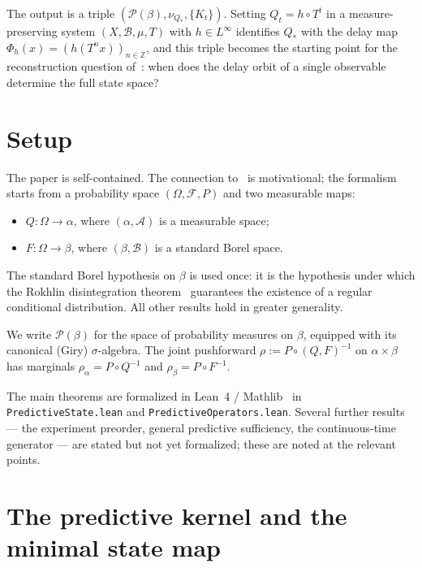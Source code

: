 The output is a triple $(\mathcal{P}(\beta), \nu_{Q_*}, \{K_t\})$.
Setting $Q_t = h \circ T^t$ in a measure-preserving system
$(X, \mathcal{B}, \mu, T)$ with $h \in L^\infty$ identifies $Q_*$ with the
delay map $\Phi_h(x) = (h(T^n x))_{n \in \mathbb{Z}}$, and this triple becomes
the starting point for the reconstruction question of~\cite{mahon_paper3}: when
does the delay orbit of a single observable determine the full state space?

\section{Setup}
\label{sec:setup}

The paper is self-contained.  The connection to~\cite{mahon_paper1} is
motivational; the formalism starts from a probability space
$(\Omega, \mathcal{F}, P)$ and two measurable maps:
\begin{itemize}
  \item $Q : \Omega \to \alpha$, where $(\alpha, \mathcal{A})$ is a measurable
    space;
  \item $F : \Omega \to \beta$, where $(\beta, \mathcal{B})$ is a standard
    Borel space.
\end{itemize}
The standard Borel hypothesis on $\beta$ is used once: it is the hypothesis
under which the Rokhlin disintegration theorem~\cite{Rokhlin1952} guarantees the
existence of a regular conditional distribution.  All other results hold in
greater generality.

We write $\mathcal{P}(\beta)$ for the space of probability measures on $\beta$,
equipped with its canonical (Giry) $\sigma$-algebra.  The joint pushforward
$\rho := P \circ (Q, F)^{-1}$ on $\alpha \times \beta$ has marginals
$\rho_\alpha = P \circ Q^{-1}$ and $\rho_\beta = P \circ F^{-1}$.

The main theorems are formalized in Lean~4 / Mathlib~\cite{Mathlib} in
\texttt{PredictiveState.lean} and \texttt{PredictiveOperators.lean}.  Several
further results — the experiment preorder, general predictive sufficiency, the
continuous-time generator — are stated but not yet formalized; these are noted
at the relevant points.

\section{The predictive kernel and the minimal state map}
\label{sec:predictive}

